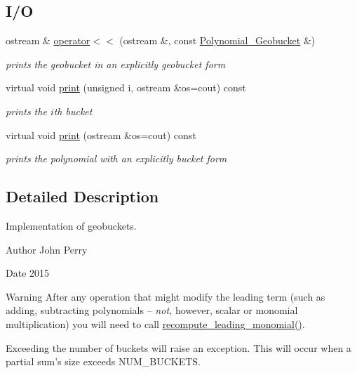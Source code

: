 \subsection*{I/O}
\begin{DoxyCompactItemize}
\item 
ostream \& \hyperlink{class_polynomial___geobucket_af97062198c6ade3e8d3077308e89669d}{operator$<$$<$} (ostream \&, const \hyperlink{class_polynomial___geobucket}{Polynomial\+\_\+\+Geobucket} \&)
\begin{DoxyCompactList}\small\item\em prints the geobucket in an explicitly geobucket form \end{DoxyCompactList}\item 
virtual void \hyperlink{class_polynomial___geobucket_a672dd35e16935aaa5d5334283eab918e}{print} (unsigned i, ostream \&os=cout) const
\begin{DoxyCompactList}\small\item\em prints the $i$th bucket \end{DoxyCompactList}\item 
virtual void \hyperlink{class_polynomial___geobucket_a90a039a358138a6e38a563ec6a9b4bc7}{print} (ostream \&os=cout) const
\begin{DoxyCompactList}\small\item\em prints the polynomial with an explicitly bucket form \end{DoxyCompactList}\end{DoxyCompactItemize}


\subsection{Detailed Description}
Implementation of geobuckets. 

\begin{DoxyAuthor}{Author}
John Perry 
\end{DoxyAuthor}
\begin{DoxyDate}{Date}
2015 
\end{DoxyDate}
\begin{DoxyWarning}{Warning}
After any operation that might modify the leading term (such as adding, subtracting polynomials -- {\itshape not,} however, scalar or monomial multiplication) you will need to call \hyperlink{class_polynomial___geobucket_ab57dbe8d5f0d3860997775d9f354ab0c}{recompute\+\_\+leading\+\_\+monomial()}. 

Exceeding the number of buckets will raise an exception. This will occur when a partial sum's size exceeds {\ttfamily N\+U\+M\+\_\+\+B\+U\+C\+K\+E\+TS}. 
\end{DoxyWarning}


